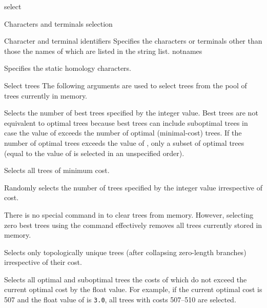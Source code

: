 \begin{command}{select}{}
\begin{arguments}
\begin{argumentgroup}{Characters and terminals selection}
\begin{arguments}
\begin{argumentgroup}{Character and terminal identifiers}
                {Specifies the characters or terminals other than those the
                names of which are listed in the string list.}
                {notnames}

           
                {Specifies the static homology characters.}
                {}

        \end{argumentgroup}

        \begin{argumentgroup}{Select trees}
            {The following arguments are used to select trees from the pool of trees currently in memory.}

                {Selects the number of best trees specified by the integer value.
                Best trees are not equivalent to optimal trees because best trees
                can include suboptimal trees in case the value of
                 exceeds the number of optimal (minimal-cost)
                trees. If the number of optimal trees exceeds the value of
                , only a subset of optimal trees (equal to the
                value of  is selected in an unspecified order).} 
                 {}

                {Selects all trees of minimum cost.} 
                {}
            
                {Randomly selects the number of trees specified by the integer
                value irrespective of cost.} 
                {}

            \begin{statement}
               There is no special command in \poy to clear trees from memory. However,
               selecting zero best trees using the command 
               effectively removes all trees currently stored in memory.
            \end{statement}
            
                {Selects only topologically unique trees (after collapsing zero-length
                branches) irrespective of their cost.} 
                {}

                {Selects all optimal and suboptimal trees the costs of which do not exceed
                the current optimal cost by the float value. For example, if the current
                optimal cost is 507 and the float value of  is
                \texttt{3.0}, all trees with costs 507--510 are selected.} 
                {}


\end{argumentgroup}
\end{arguments}
\end{argumentgroup}
\end{arguments}
\end{command}
